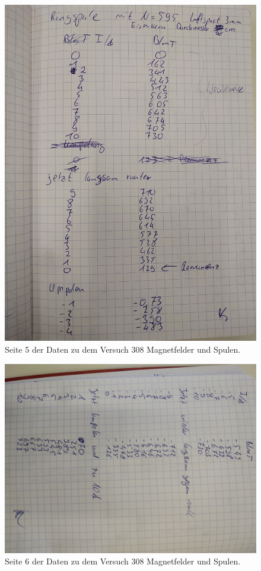 \begin{figure}
\centering
\includegraphics[width=\textwidth]{content/daten5.jpg}
\caption{Seite 5 der Daten zu dem Versuch 308 Magnetfelder und Spulen.}
\end{figure}

\begin{figure}
\centering
\includegraphics[width=\textwidth,angle=90]{content/daten6.jpg}
\caption{Seite 6 der Daten zu dem Versuch 308 Magnetfelder und Spulen.}
\end{figure}